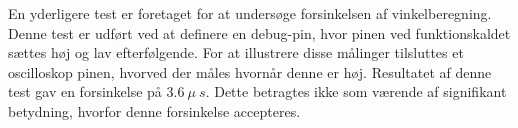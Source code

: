 %
%

\noindent
En yderligere test er foretaget for at undersøge forsinkelsen af vinkelberegning. Denne test er udført ved at definere en debug-pin, hvor pinen ved funktionskaldet sættes høj og lav efterfølgende. For at illustrere disse målinger tilsluttes et oscilloskop pinen, hvorved der måles hvornår denne er høj. Resultatet af denne test gav en forsinkelse på  $3.6~\mu~s$. Dette betragtes ikke som værende af signifikant betydning, hvorfor denne forsinkelse accepteres.


